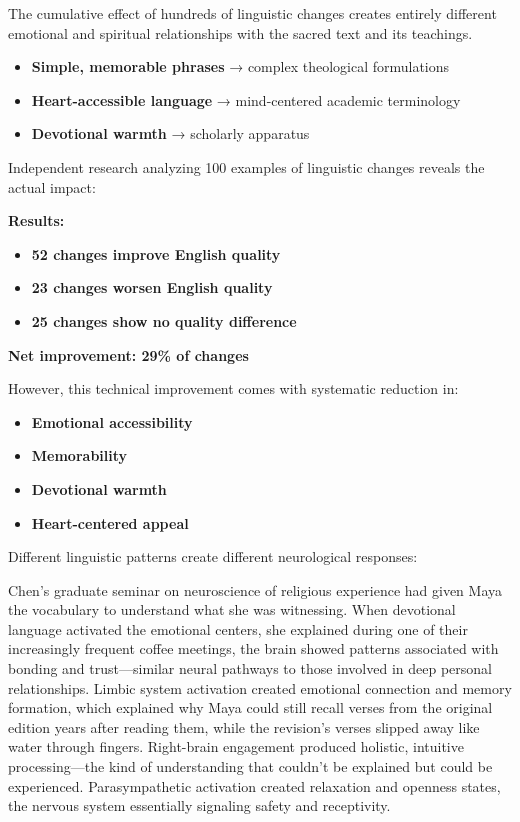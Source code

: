 \documentclass[12pt,twoside]{book}
\begin{document}
The cumulative effect of hundreds of linguistic changes creates entirely different emotional and spiritual relationships with the sacred text and its teachings.

\begin{itemize}
\item \textbf{\textbf{Simple, memorable phrases}} → complex theological formulations
\item \textbf{\textbf{Heart-accessible language}} → mind-centered academic terminology
\item \textbf{\textbf{Devotional warmth}} → scholarly apparatus
\end{itemize}

Independent research analyzing 100 examples of linguistic changes reveals the actual impact:

\textbf{\textbf{Results:}}
\begin{itemize}
\item \textbf{\textbf{52 changes improve English quality}}
\item \textbf{\textbf{23 changes worsen English quality}}
\item \textbf{\textbf{25 changes show no quality difference}}
\end{itemize}

\textbf{\textbf{Net improvement: 29\% of changes}}

However, this technical improvement comes with systematic reduction in:
\begin{itemize}
\item \textbf{\textbf{Emotional accessibility}}
\item \textbf{\textbf{Memorability}}
\item \textbf{\textbf{Devotional warmth}}
\item \textbf{\textbf{Heart-centered appeal}}
\end{itemize}

Different linguistic patterns create different neurological responses:

Chen's graduate seminar on neuroscience of religious experience had given Maya the vocabulary to understand what she was witnessing. When devotional language activated the emotional centers, she explained during one of their increasingly frequent coffee meetings, the brain showed patterns associated with bonding and trust—similar neural pathways to those involved in deep personal relationships. Limbic system activation created emotional connection and memory formation, which explained why Maya could still recall verses from the original edition years after reading them, while the revision's verses slipped away like water through fingers. Right-brain engagement produced holistic, intuitive processing—the kind of understanding that couldn't be explained but could be experienced. Parasympathetic activation created relaxation and openness states, the nervous system essentially signaling safety and receptivity.
\end{document}
